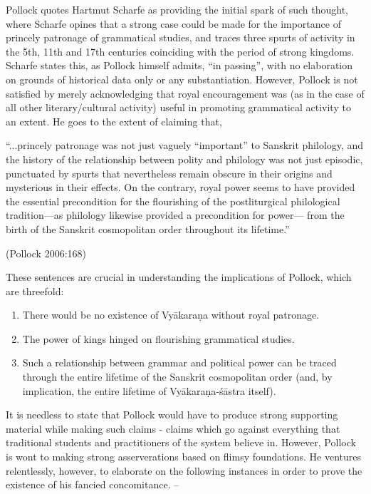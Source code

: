 Pollock quotes Hartmut Scharfe as providing the initial spark of such thought, where Scharfe opines that a strong case could be made for the importance of princely patronage of grammatical studies, and traces three spurts of activity in the 5th, 11th and 17th centuries coinciding with the period of strong kingdoms. Scharfe states this, as Pollock himself admits, ``in passing'', with no elaboration on grounds of historical data only or any substantiation. However, Pollock is not satisfied by merely acknowledging that royal encouragement was (as in the case of all other literary/cultural activity) useful in promoting grammatical activity to an extent. He goes to the extent of claiming that,
\begin{myquote}
``...princely patronage was not just vaguely ``important'' to Sanskrit philology, and the history of the relationship between polity and philology was not just episodic, punctuated by spurts that nevertheless remain obscure in their origins and mysterious in their effects. On the contrary, royal power seems to have provided the essential precondition for the flourishing of the postliturgical philological tradition---as philology likewise provided a precondition for power--- from the birth of the Sanskrit cosmopolitan order throughout its lifetime.''

\hfill (Pollock 2006:168)
\end{myquote}

These sentences are crucial in understanding the implications of Pollock, which are threefold:
\begin{enumerate}
\item There would be no existence of Vyākaraṇa without royal patronage. 
\item The power of kings hinged on flourishing grammatical studies.
\item Such a relationship between grammar and political power can be traced through the entire lifetime of the Sanskrit cosmopolitan order (and, by implication, the entire lifetime of Vyākaraṇa-śāstra itself).
\end{enumerate}

It is needless to state that Pollock would have to produce strong supporting material while making such claims - claims which go against everything that traditional students and practitioners of the system believe in. However, Pollock is wont to making strong asserverations based on flimsy foundations. He ventures relentlessly, however, to elaborate on the following instances in order to prove the existence of his fancied concomitance. --


